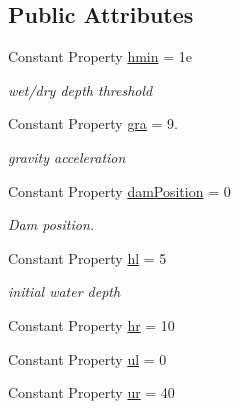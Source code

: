 \subsection*{Public Attributes}
\begin{DoxyCompactItemize}
\item 
Constant Property \hyperlink{class_dam_break_sep_uniform_mesh2d_a9baea0a54cced5236f459123d6cbc9ce}{hmin} = 1e
\begin{DoxyCompactList}\small\item\em wet/dry depth threshold \end{DoxyCompactList}\item 
Constant Property \hyperlink{class_dam_break_sep_uniform_mesh2d_a1b965856eca49b21e120abbad2eebf78}{gra} = 9.
\begin{DoxyCompactList}\small\item\em gravity acceleration \end{DoxyCompactList}\item 
Constant Property \hyperlink{class_dam_break_sep_uniform_mesh2d_a64dd9a4356705bbb02688f56e59a561c}{dam\+Position} = 0
\begin{DoxyCompactList}\small\item\em Dam position. \end{DoxyCompactList}\item 
Constant Property \hyperlink{class_dam_break_sep_uniform_mesh2d_abaf4f4eff6e9fbf4a0c72c5a595efdbf}{hl} = 5
\begin{DoxyCompactList}\small\item\em initial water depth \end{DoxyCompactList}\item 
Constant Property \hyperlink{class_dam_break_sep_uniform_mesh2d_a190b4d2c5225d8ea54e03a7a876aa4db}{hr} = 10
\item 
Constant Property \hyperlink{class_dam_break_sep_uniform_mesh2d_a861c7f132af6770621b2a992017ea1c4}{ul} = 0
\item 
Constant Property \hyperlink{class_dam_break_sep_uniform_mesh2d_a5e78f070e090267b054250d5d2f24c59}{ur} = 40
\end{DoxyCompactItemize}
